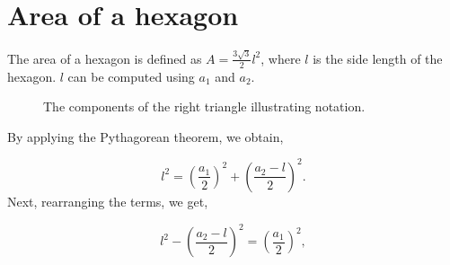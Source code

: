 \documentclass[
  12pt]{article}
\begin{document}
\newpage

\section{Area of a hexagon}\label{area-of-a-hexagon}

The area of a hexagon is defined as \(A = \frac{3\sqrt{3}}{2}l^2\),
where \(l\) is the side length of the hexagon. \(l\) can be computed
using \(a_1\) and \(a_2\).

\begin{figure}


\caption{\label{fig-tri-param}The components of the right triangle
illustrating notation.}

\end{figure}%

By applying the Pythagorean theorem, we obtain,

\[
l^2 = \left(\frac{a_1}{2}\right)^2 + \left(\frac{a_2 - l}{2}\right)^2.
\] Next, rearranging the terms, we get,

\[
l^2 - \left(\frac{a_2 - l}{2}\right)^2 = \left(\frac{a_1}{2}\right)^2,
\]
\end{document}
